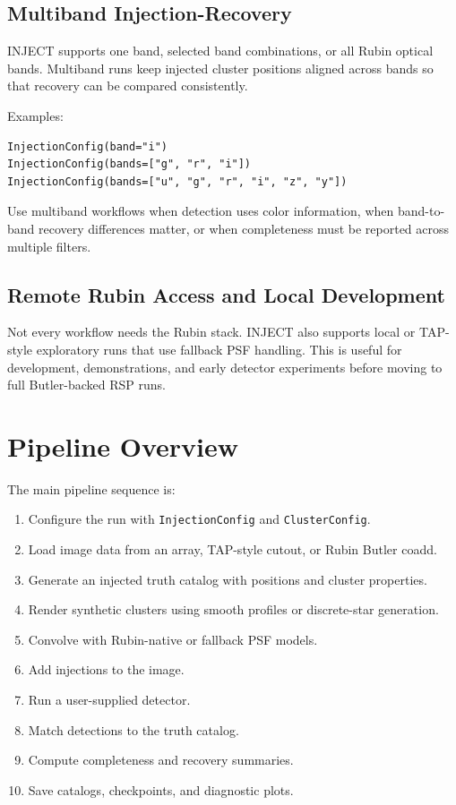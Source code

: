 \documentclass[11pt]{article}
\begin{document}
\subsection{Multiband Injection-Recovery}

INJECT supports one band, selected band combinations, or all Rubin optical bands. Multiband runs keep injected cluster positions aligned across bands so that recovery can be compared consistently.

Examples:
\begin{verbatim}
InjectionConfig(band="i")
InjectionConfig(bands=["g", "r", "i"])
InjectionConfig(bands=["u", "g", "r", "i", "z", "y"])
\end{verbatim}

Use multiband workflows when detection uses color information, when band-to-band recovery differences matter, or when completeness must be reported across multiple filters.

\subsection{Remote Rubin Access and Local Development}

Not every workflow needs the Rubin stack. INJECT also supports local or TAP-style exploratory runs that use fallback PSF handling. This is useful for development, demonstrations, and early detector experiments before moving to full Butler-backed RSP runs.

\section{Pipeline Overview}

The main pipeline sequence is:

\begin{enumerate}[leftmargin=*]
    \item Configure the run with \texttt{InjectionConfig} and \texttt{ClusterConfig}.
    \item Load image data from an array, TAP-style cutout, or Rubin Butler coadd.
    \item Generate an injected truth catalog with positions and cluster properties.
    \item Render synthetic clusters using smooth profiles or discrete-star generation.
    \item Convolve with Rubin-native or fallback PSF models.
    \item Add injections to the image.
    \item Run a user-supplied detector.
    \item Match detections to the truth catalog.
    \item Compute completeness and recovery summaries.
    \item Save catalogs, checkpoints, and diagnostic plots.
\end{enumerate}
\end{document}
